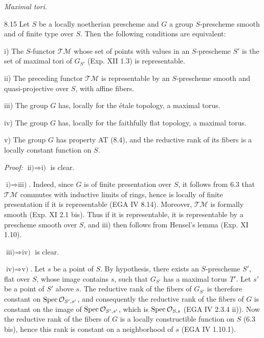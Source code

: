 \par\noindent\emph{Maximal tori.}
\begin{theorem}{8.15}\label{XV.8.15}
Let $S$ be a locally noetherian prescheme and $G$ a group $S$-prescheme smooth and of finite type over $S$. Then the following conditions are equivalent:

\noindent i) The $S$-functor $\mathscr{TM}$ whose set of points with values in an $S$-prescheme $S'$ is the set of maximal tori of $G_{S'}$ (Exp. XII 1.3) is representable.

\noindent ii) The preceding functor $\mathscr{TM}$ is representable by an $S$-prescheme smooth and quasi-projective over $S$, with affine fibers.

\noindent iii) The group $G$ has, locally for the étale topology, a maximal torus.

\noindent iv) The group $G$ has, locally for the faithfully flat topology, a maximal torus.

\noindent v) The group $G$ has property AT (8.4), and the reductive rank of its fibers is a locally constant function on $S$.
\end{theorem}
\par\noindent\emph{Proof:} $\text{ii)}\Rightarrow\text{i)}$ is clear.

$\text{i)}\Rightarrow\text{iii)}$. Indeed, since $G$ is of finite presentation over $S$, it follows from 6.3 that $\mathscr{TM}$ commutes with inductive limits of rings, hence is locally of finite presentation if it is representable (EGA IV 8.14). Moreover, $\mathscr{TM}$ is formally smooth (Exp. XI 2.1 bis). Thus if it is representable, it is representable by a prescheme smooth over $S$, and iii) then follows from Hensel's lemma (Exp. XI 1.10).

$\text{iii)}\Rightarrow\text{iv)}$ is clear.

$\text{iv)}\Rightarrow\text{v)}$. Let $s$ be a point of $S$. By hypothesis, there exists an $S$-prescheme $S'$, flat over $S$, whose image contains $s$, such that $G_{S'}$ has a maximal torus $T'$. Let $s'$ be a point of $S'$ above $s$. The reductive rank of the fibers of $G_{S'}$ is therefore constant on $\operatorname{Spec}\mathcal{O}_{S',s'}$, and consequently the reductive rank of the fibers of $G$ is constant on the image of $\operatorname{Spec}\mathcal{O}_{S',s'}$, which is $\operatorname{Spec}\mathcal{O}_{S,s}$ (EGA IV 2.3.4 ii)). Now the reductive rank of the fibers of $G$ is a locally constructible function on $S$ (6.3 bis), hence this rank is constant on a neighborhood of $s$ (EGA IV 1.10.1).


